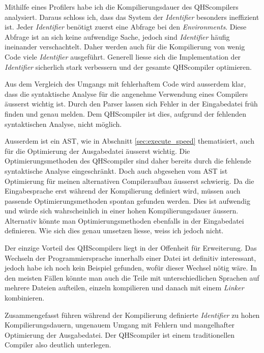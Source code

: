 Mithilfe eines Profilers habe ich die Kompilierungsdauer des QHScompilers analysiert. Daraus schloss ich, dass das System der \textit{Identifier} besonders ineffizient ist. 
Jeder \textit{Identifier} benötigt zuerst eine Abfrage bei den \textit{Environments}. Diese Abfrage ist an sich keine aufwendige Sache, jedoch sind \textit{Identifier} häufig ineinander verschachtelt.
Daher werden auch für die Kompilierung von wenig Code viele \textit{Identifier} ausgeführt. Generell liesse sich die Implementation der \textit{Identifier} sicherlich stark verbessern und der gesamte QHScompiler optimieren.

Aus dem Vergleich des Umgangs mit fehlerhaftem Code wird ausserdem klar, dass die syntaktische Analyse für die angenehme Verwendung eines Compilers äusserst wichtig ist.
Durch den Parser lassen sich Fehler in der Eingabedatei früh finden und genau melden. Dem QHScompiler ist dies, aufgrund der fehlenden syntaktischen Analyse, nicht möglich.

Ausserdem ist ein AST, wie in Abschnitt \ref{sec:execute_speed} thematisiert, auch für die Optimierung der Ausgabedatei äusserst wichtig.
Die Optimierungsmethoden des QHScompiler sind daher bereits durch die fehlende syntaktische Analyse  eingeschränkt.
Doch auch abgesehen vom AST ist Optimierung für meinen alternativen Compileraufbau äusserst schwierig. Da die Eingabesprache erst während der Kompilierung definiert wird, müssen auch passende Optimierungsmethoden spontan gefunden werden.
Dies ist aufwendig und würde sich wahrscheinlich in einer hohen Kompilierungsdauer äussern. Alternativ könnte man Optimierungsmethoden ebenfalls in der Eingabedatei definieren.
Wie sich dies genau umsetzen liesse, weiss ich jedoch nicht.

Der einzige Vorteil des QHScompilers liegt in der Offenheit für Erweiterung.
Das Wechseln der Programmiersprache innerhalb einer Datei ist definitiv interessant, jedoch habe ich noch kein Beispiel gefunden, wofür dieser Wechsel nötig wäre.
In den meisten Fällen könnte man auch die Teile mit unterschiedlichen Sprachen auf mehrere Dateien aufteilen, einzeln kompilieren und danach mit einem \textit{Linker} kombinieren.

Zusammengefasst führen während der Kompilierung definierte \textit{Identifier} zu hohen Kompilierungsdauern, ungenauem Umgang mit Fehlern und mangelhafter Optimierung der Ausgabedatei.
Der QHScompiler ist einem traditionellen Compiler also deutlich unterlegen.
